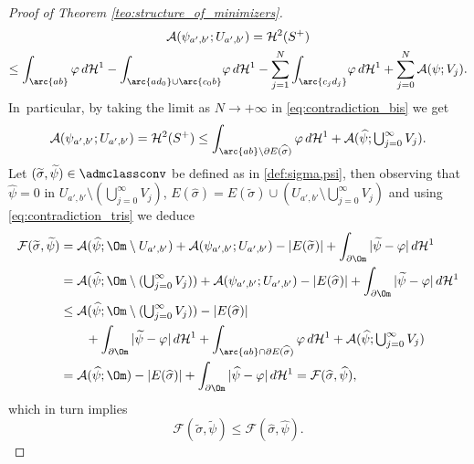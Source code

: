 \begin{proof}[Proof of Theorem \ref{teo:structure_of_minimizers}]
\begin{multline}
\mathcal{A}(\psi_{a',b'};U_{a',b'})=\mathcal{H}^2(S^+)\\
\le \int_{\arc{ab}}\varphi\,d\mathcal{H}^1-\int_{\arc{ad_0}\cup\arc{c_0b}}\!\varphi\,d\mathcal{H}^1-\sum_{j=1}^N\int_{\arc{c_jd_j}}\!\varphi\,d\mathcal{H}^1+\sum_{j=0}^N \mathcal{A}(\psi;V_j).
\end{multline}
In~particular, by taking the limit as $N\to+\infty$ in \eqref{eq:contradiction_bis} we get
\begin{equation}\label{eq:contradiction_tris}
\mathcal{A}(\psi_{a',b'};U_{a',b'})=\mathcal{H}^2(S^+)\le \int_{\arc{ab}\setminus\partial E(\widehat\sigma)}\varphi\,d\mathcal{H}^1+\textstyle\mathcal{A}(\widehat\psi;\bigcup_{j=0}^\infty V_j).
\end{equation}
Let $(\widetilde\sigma,\widetilde\psi)\in\admclassconv$ be defined as in \eqref{def:sigma,psi}, then observing that $\widehat\psi=0$ in $U_{a',b'}\setminus(\bigcup_{j=0}^\infty V_j)$, $E(\widehat\sigma)=E(\widetilde\sigma)\cup (U_{a',b'}\setminus\bigcup_{j=0}^\infty V_j)$ and using \eqref{eq:contradiction_tris} we deduce
\begin{equation*}
\begin{split}
{\mathcal F}(\widetilde\sigma,\widetilde\psi)
&=\mathcal{A}(\widehat\psi;\Om\setminus U_{a',b'})+\mathcal{A}(\psi_{a',b'};U_{a',b'})-|E(\widetilde\sigma)|+\int_{\partial\Om}|\widetilde\psi-\varphi|\,d\mathcal{H}^1\\
&=\mathcal{A}(\widehat\psi;\Om\setminus({\textstyle\bigcup_{j=0}^\infty V_j)})+\mathcal{A}(\psi_{a',b'};U_{a',b'})-|E(\widehat\sigma)|+\int_{\partial\Om}|\widetilde\psi-\varphi|\,d\mathcal{H}^1\\
&\le\mathcal{A}(\widehat\psi;\Om\setminus({\textstyle\bigcup_{j=0}^\infty V_j)})-|E(\widehat\sigma)|\\
&\qquad +\int_{\partial\Om}|\widetilde\psi-\varphi|\,d\mathcal{H}^1+\int_{\arc{ab}\cap\partial E(\widehat\sigma)}\varphi\,d\mathcal{H}^1+{\textstyle\mathcal{A}(\widehat\psi;\bigcup_{j=0}^\infty V_j)}\\
&=\mathcal{A}(\widehat\psi;\Om)-|E(\widehat\sigma)|+\int_{\partial\Om}|\widehat\psi-\varphi|\,d\mathcal{H}^1= {\mathcal F}(\widehat\sigma,\widehat\psi),
\end{split}
\end{equation*}
which in turn implies\vspace*{-3pt}
\begin{equation}\label{eq:contradiction_four}
{\mathcal F}(\widetilde\sigma,\widetilde\psi)\le
{\mathcal F}(\widehat\sigma,\widehat\psi).
\end{equation}

\end{proof}
